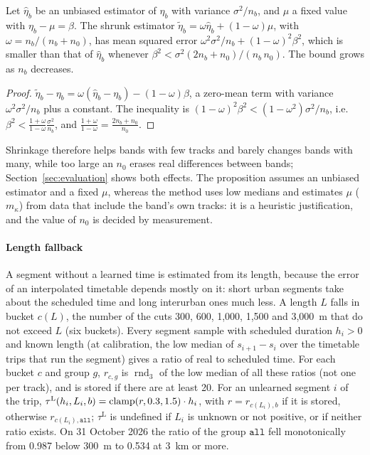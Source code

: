 \begin{proposition}
\label{prop:shrinkage}
Let $\hat\eta_b$ be an unbiased estimator of $\eta_b$ with variance $\sigma^2/n_b$, and $\mu$ a fixed value with
$\eta_b-\mu=\beta$. The shrunk estimator $\tilde\eta_b=\omega\hat\eta_b+(1-\omega)\mu$, with
$\omega=n_b/(n_b+n_0)$, has mean squared error $\omega^2\sigma^2/n_b+(1-\omega)^2\beta^2$, which is smaller than that
of $\hat\eta_b$ whenever $\beta^2<\sigma^2(2n_b+n_0)/(n_b\,n_0)$. The bound grows as $n_b$ decreases.
\end{proposition}
\begin{proof}
$\tilde\eta_b-\eta_b=\omega(\hat\eta_b-\eta_b)-(1-\omega)\beta$, a zero-mean term with variance
$\omega^2\sigma^2/n_b$ plus a constant. The inequality is $(1-\omega)^2\beta^2<(1-\omega^2)\sigma^2/n_b$, i.e.\
$\beta^2<\frac{1+\omega}{1-\omega}\frac{\sigma^2}{n_b}$, and $\frac{1+\omega}{1-\omega}=\frac{2n_b+n_0}{n_0}$.
\end{proof}

\noindent Shrinkage therefore helps bands with few tracks and barely changes bands with many, while too large an $n_0$
erases real differences between bands; Section~\ref{sec:evaluation} shows both effects. The proposition assumes an
unbiased estimator and a fixed $\mu$, whereas the method uses low medians and estimates $\mu$ ($m_\kappa$) from data
that include the band's own tracks: it is a heuristic justification, and the value of $n_0$ is decided by
measurement.

\paragraph{Length fallback} A segment without a learned time is estimated from its length, because the error of an
interpolated timetable depends mostly on it: short urban segments take about the scheduled time and long interurban
ones much less. A length $L$ falls in bucket $c(L)$, the number of the cuts 300, 600, 1,000, 1,500 and 3,000~m that
do not exceed $L$ (six buckets). Every segment sample with scheduled duration $h_i>0$ and known length (at
calibration, the low median of $s_{i+1}-s_i$ over the timetable trips that run the segment) gives a ratio of real to
scheduled time. For each bucket $c$ and group $g$, $r_{c,g}$ is $\operatorname{rnd}_3$ of the low median of all these
ratios (not one per track), and is stored if there are at least 20. For an unlearned segment $i$ of the trip,
$\tau^{\mathrm L}(h_i,L_i,b)=\operatorname{clamp}(r,0.3,1.5)\cdot h_i$, with $r=r_{c(L_i),b}$ if it is stored, otherwise
$r_{c(L_i),\mathtt{all}}$; $\tau^{\mathrm L}$ is undefined if $L_i$ is unknown or not positive, or if neither ratio
exists. On 31 October 2026 the ratio of the group $\mathtt{all}$ fell monotonically from 0.987 below 300~m to 0.534
at 3~km or more.

